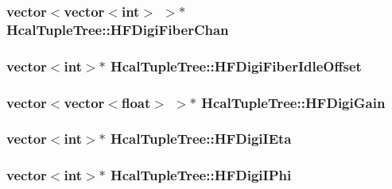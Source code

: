 \subsubsection[{H\+F\+Digi\+Fiber\+Chan}]{\setlength{\rightskip}{0pt plus 5cm}vector$<$vector$<$int$>$ $>$$\ast$ Hcal\+Tuple\+Tree\+::\+H\+F\+Digi\+Fiber\+Chan}\label{class_hcal_tuple_tree_a739afd6b2bb92d5fd58d345333531cc9}
\hypertarget{class_hcal_tuple_tree_a06e52ec27931ef2fc92bcc0efc8901ba}{}
\subsubsection[{H\+F\+Digi\+Fiber\+Idle\+Offset}]{\setlength{\rightskip}{0pt plus 5cm}vector$<$int$>$$\ast$ Hcal\+Tuple\+Tree\+::\+H\+F\+Digi\+Fiber\+Idle\+Offset}\label{class_hcal_tuple_tree_a06e52ec27931ef2fc92bcc0efc8901ba}
\hypertarget{class_hcal_tuple_tree_abc594e1718c4ca609859b9c5da187ce9}{}
\subsubsection[{H\+F\+Digi\+Gain}]{\setlength{\rightskip}{0pt plus 5cm}vector$<$vector$<$float$>$ $>$$\ast$ Hcal\+Tuple\+Tree\+::\+H\+F\+Digi\+Gain}\label{class_hcal_tuple_tree_abc594e1718c4ca609859b9c5da187ce9}
\hypertarget{class_hcal_tuple_tree_add1b36acb835d09d747c682fb65ce7c9}{}
\subsubsection[{H\+F\+Digi\+I\+Eta}]{\setlength{\rightskip}{0pt plus 5cm}vector$<$int$>$$\ast$ Hcal\+Tuple\+Tree\+::\+H\+F\+Digi\+I\+Eta}\label{class_hcal_tuple_tree_add1b36acb835d09d747c682fb65ce7c9}
\hypertarget{class_hcal_tuple_tree_aaba8842e7e41699165e52a3345e36221}{}
\subsubsection[{H\+F\+Digi\+I\+Phi}]{\setlength{\rightskip}{0pt plus 5cm}vector$<$int$>$$\ast$ Hcal\+Tuple\+Tree\+::\+H\+F\+Digi\+I\+Phi}\label{class_hcal_tuple_tree_aaba8842e7e41699165e52a3345e36221}
\hypertarget{class_hcal_tuple_tree_aba96a4641a9750ed5bcc626abbe44c3c}{}
